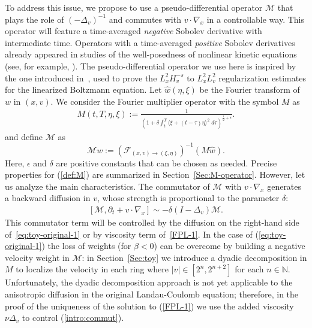 \documentclass[11pt,american, reqno]{amsart}
\numberwithin{equation}{section}
\newcommand{\N}{\mathbb N}
\newcommand{\1}{\mathds{1}}
\newcommand{\del}{\partial}
\newcommand{\CalM}{\mathcal{M}}
\newcommand{\Eps}{\epsilon}
\numberwithin{equation}{section}
\begin{document}
To address this issue, we propose to use a pseudo-differential operator $\mathcal{M}$ that plays the role of $(-\Delta_v)^{-1}$ and commutes with $v \cdot \nabla_x$ in a controllable way. This operator will feature a time-averaged {\em{negative}} Sobolev derivative with intermediate time. Operators with a time-averaged {\em{positive}} Sobolev derivatives already appeared in studies of the well-posedness of nonlinear kinetic equations (see, for example, \cite{MX2020}). The pseudo-differential operator we use here is inspired by the one introduced in~\cite{AMSY2020}, used to prove the $L^2_x H^{-s}_v$ to $L^2_x L^2_v$ regularization estimates for the linearized Boltzmann equation. Let $\widehat{w}(\eta,\xi) $ be the Fourier transform of $w$ in $(x, v)$. We consider the Fourier multiplier operator with the symbol ${M}$ as 
\begin{align} \label{def:M}
{M}(t,T, \eta,\xi) := \frac{1}{\left( 1 + \delta \int_t ^T \langle \xi +(t- \tau) \eta\rangle^{2} \;d\tau\right)^{\frac{1}{2}+ \Eps}}.
\end{align}
and define ${\mathcal{M}}$ as 
$$
{\mathcal{M}} w:= ({\mathcal{F}_{(x,v) \to (\xi, \eta)}})^{-1}({M} \widehat{w} ).
$$
Here, $\Eps$ and $\delta$ are positive constants that can be chosen as needed. Precise properties for (\ref{def:M}) are summarized in Section~\ref{Sec:M-operator}. However, let us analyze the main characteristics. The commutator of $\CalM$ with $v \cdot \nabla_x$ generates a backward diffusion in $v$, whose strength is proportional to the parameter $\delta$: 
\begin{align} \label{intro:commut}
[\CalM, \del_t + v \cdot \nabla_x]  
\sim  
- \delta (I - \Delta_v) \mathcal{M}.
\end{align}
This commutator term will be controlled by the diffusion on the right-hand side of~\eqref{eq:toy-original-1} or by viscosity term of~\eqref{FPL-1}. 
In the case of (\ref{eq:toy-original-1}) the loss of weights (for $\beta <0$) can be overcome by building a negative velocity weight in $\CalM$: in Section~\ref{Sec:toy} we introduce a dyadic decomposition in $M$ to localize the velocity in each ring where $|v| \in [2^n, 2^{n+2}]$ for each $n \in \N$. 
Unfortunately, the dyadic decomposition approach is not yet applicable to the anisotropic diffusion in the original Landau-Coulomb equation; therefore, in the proof of the uniqueness of the solution to (\ref{FPL-1}) we use the added viscosity $ \nu \Delta_v$ to control (\ref{intro:commut}). 

\end{document}
